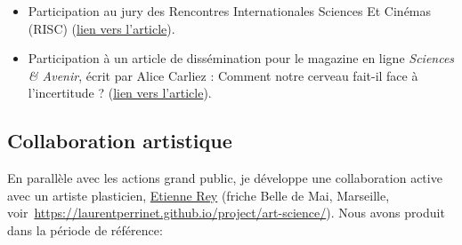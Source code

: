 \documentclass[10pt,french,a4paper]{article}%
\begin{document}
\begin{itemize}
    \item Participation au jury des \og Rencontres Internationales Sciences Et Cinémas (RISC) \fg{} (\href{https://laurentperrinet.github.io/post/2023-12-16-risc/}{lien vers l'article}).

    \item Participation à un article de dissémination pour le magazine en ligne \textit{Sciences \& Avenir}, écrit par Alice Carliez : \og Comment notre cerveau fait-il face à l’incertitude ? \fg{} (\href{https://laurentperrinet.github.io/post/2023-07-26-epsiloon/}{lien vers l'article}).







\end{itemize}



\subsection{Collaboration artistique} %

En parallèle avec les actions grand public, je développe une collaboration active avec un artiste plasticien, \href{https://laurentperrinet.github.io/authors/etienne-rey/}{Etienne Rey} (friche Belle de Mai, Marseille, voir~\url{https://laurentperrinet.github.io/project/art-science/}). Nous avons produit dans la période de référence:
\end{document}
